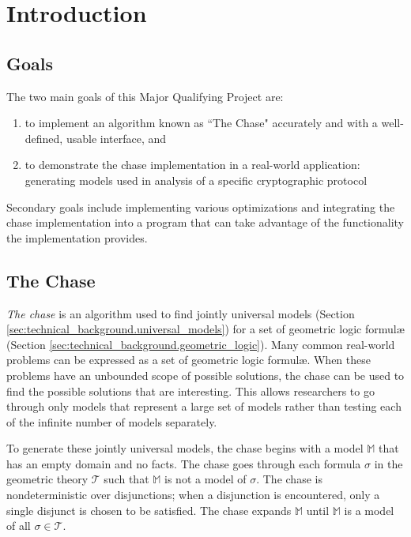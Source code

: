 \section{Introduction}

	\subsection{Goals}

		The two main goals of this Major Qualifying Project are:

		\begin{enumerate}
		\item to implement an algorithm known as ``The Chase" accurately
		and with a well-defined, usable interface, and
		\item to demonstrate the chase implementation in a real-world
		application: generating models used in analysis of a specific
		cryptographic protocol
		\end{enumerate}

		Secondary goals include implementing various optimizations and
		integrating the chase implementation into a program that can take
		advantage of the functionality the implementation provides.

	\subsection{The Chase}

		\emph{The chase} is an algorithm used to find jointly universal models
		(Section \ref{sec:technical_background.universal_models}) for a set of
		geometric logic formul{\ae} (Section
		\ref{sec:technical_background.geometric_logic}). Many common real-world
		problems can be expressed as a set of geometric logic formul{\ae}. When
		these problems have an unbounded scope of possible solutions, the chase
		can be used to find the possible solutions that are interesting. This
		allows researchers to go through only models that represent a large set
		of models rather than testing each of the infinite number of models
		separately.


		To generate these jointly universal models, the chase begins with a
		model $\mathbb{M}$ that has an empty domain and no facts. The chase
		goes through each formula $\sigma$ in the geometric theory
		$\mathcal{T}$ such that $\mathbb{M}$ is not a model of $\sigma$. The
		chase is nondeterministic over disjunctions; when a disjunction is
		encountered, only a single disjunct is chosen to be satisfied. The
		chase expands $\mathbb{M}$ until $\mathbb{M}$ is a model of all $\sigma
		\in \mathcal{T}$.

